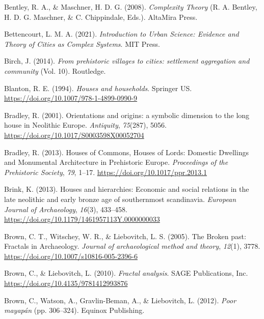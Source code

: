 \documentclass[
  12pt,
]{book}
\newlength{\cslhangindent}
\newlength{\cslentryspacingunit} %
\newenvironment{CSLReferences}[2] %
 {%
  \setlength{\parindent}{0pt}
  \ifodd #1
  \let\oldpar\par
  \def\par{\hangindent=\cslhangindent\oldpar}
  \fi
  \setlength{\parskip}{#2\cslentryspacingunit}
 }%
 {}
\begin{document}
\begin{CSLReferences}{1}{0}
\leavevmode{}%
Bentley, R. A., \& Maschner, H. D. G. (2008). \emph{Complexity Theory} (R. A. Bentley, H. D. G. Maschner, \& C. Chippindale, Eds.). AltaMira Press.

\leavevmode{}%
Bettencourt, L. M. A. (2021). \emph{Introduction to Urban Science: Evidence and Theory of Cities as Complex Systems}. MIT Press.

\leavevmode{}%
Birch, J. (2014). \emph{From prehistoric villages to cities: settlement aggregation and community} (Vol. 10). Routledge.

\leavevmode{}%
Blanton, R. E. (1994). \emph{Houses and households}. Springer US. \url{https://doi.org/10.1007/978-1-4899-0990-9}

\leavevmode{}%
Bradley, R. (2001). Orientations and origins: a symbolic dimension to the long house in Neolithic Europe. \emph{Antiquity}, \emph{75}(287), 5056. \url{https://doi.org/10.1017/S0003598X00052704}

\leavevmode{}%
Bradley, R. (2013). Houses of Commons, Houses of Lords: Domestic Dwellings and Monumental Architecture in Prehistoric Europe. \emph{Proceedings of the Prehistoric Society}, \emph{79}, 1--17. \url{https://doi.org/10.1017/ppr.2013.1}

\leavevmode{}%
Brink, K. (2013). Houses and hierarchies: Economic and social relations in the late neolithic and early bronze age of southernmost scandinavia. \emph{European Journal of Archaeology}, \emph{16}(3), 433--458. \url{https://doi.org/10.1179/1461957113Y.0000000033}

\leavevmode{}%
Brown, C. T., Witschey, W. R., \& Liebovitch, L. S. (2005). The Broken past: Fractals in Archaeology. \emph{Journal of archaeological method and theory}, \emph{12}(1), 3778. \url{https://doi.org/10.1007/s10816-005-2396-6}

\leavevmode{}%
Brown, C., \& Liebovitch, L. (2010). \emph{Fractal analysis}. SAGE Publications, Inc. \url{https://doi.org/10.4135/9781412993876}

\leavevmode{}%
Brown, C., Watson, A., Gravlin-Beman, A., \& Liebovitch, L. (2012). \emph{Poor mayapán} (pp. 306--324). Equinox Publishing.


\end{CSLReferences}
\end{document}
